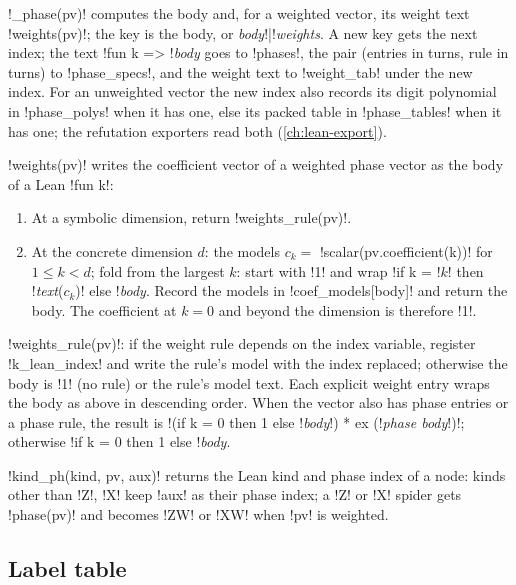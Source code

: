 {\py!_phase(pv)! computes the body and, for a weighted vector, its weight text
\py!weights(pv)!; the key is the body, or \textit{body}\code!|!\textit{weights}. A new key gets
the next index; the text \code!fun k => !\textit{body} goes to \py!phases!, the pair (entries in
turns, rule in turns) to \py!phase_specs!, and the weight text to \py!weight_tab! under the new
index. For an unweighted vector the new index also records its digit polynomial in
\py!phase_polys! when it has one, else its packed table in \py!phase_tables! when it has one; the
refutation exporters read both (\cref{ch:lean-export}).

\begin{algorithm}\label{alg:lean-export-net-weights}
\py!weights(pv)! writes the coefficient vector of a weighted phase vector as the body of a Lean
\code!fun k!:
\begin{enumerate}
\item At a symbolic dimension, return \py!weights_rule(pv)!.
\item At the concrete dimension $d$: the models $c_k = $ \py!scalar(pv.coefficient(k))! for
  $1\le k<d$; fold from the largest $k$: start with \code!1! and wrap
  \code!if k = !$k$\code! then !\textit{text}($c_k$)\code! else !\textit{body}. Record the
  models in \py!coef_models[body]! and return the body. The coefficient at $k=0$ and beyond the
  dimension is therefore \code!1!.
\end{enumerate}
\py!weights_rule(pv)!: if the weight rule depends on the index variable, register
\code!k_lean_index! and write the rule's model with the index replaced; otherwise the body is
\code!1! (no rule) or the rule's model text. Each explicit weight entry wraps the body as above
in descending order. When the vector also has phase entries or a phase rule, the result is
\code!(if k = 0 then 1 else !\textit{body}\code!) * ex (!\textit{phase body}\code!)!; otherwise
\code!if k = 0 then 1 else !\textit{body}.
\end{algorithm}

\py!kind_ph(kind, pv, aux)! returns the Lean kind and phase index of a node: kinds other than
\code!Z!, \code!X! keep \py!aux! as their phase index; a \code!Z! or \code!X! spider gets
\py!phase(pv)! and becomes \code!ZW! or \code!XW! when \py!pv! is weighted.

\subsection{Label table}\label{sec:lean-export-net-labels}

}
